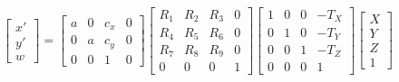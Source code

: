 \begin{equation}
    \begin{bmatrix}
    x' \\
    y' \\
    w
    \end{bmatrix}
=
    \begin{bmatrix}
    a & 0 & c_x & 0 \\
    0 & a & c_y & 0 \\
    0 & 0 & 1 & 0
    \end{bmatrix}
    \begin{bmatrix}
    R_1 & R_2 & R_3  & 0 \\
    R_4 & R_5 & R_6 & 0 \\
    R_7 & R_8 & R_9 & 0 \\
    0 & 0 & 0 & 1
    \end{bmatrix}
    \begin{bmatrix}
    1 & 0 & 0 & -T_X \\
    0 & 1 & 0 & -T_Y \\
    0 & 0 & 1 & -T_Z \\
    0 & 0 & 0 & 1
    \end{bmatrix}
    \begin{bmatrix}
    X \\
    Y \\
    Z \\
    1
    \end{bmatrix}
    \label{eq:combinedexpanded}
\end{equation}


